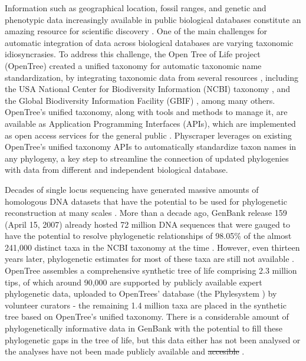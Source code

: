 \documentclass{bmcart}
\providecommand{\DIFaddtex}[1]{{\protect\color{blue}\uwave{#1}}} %
\providecommand{\DIFdeltex}[1]{{\protect\color{red}\sout{#1}}}                      %
\providecommand{\DIFaddbegin}{} %
\providecommand{\DIFaddend}{} %
\providecommand{\DIFdelbegin}{} %
\providecommand{\DIFdelend}{} %
\providecommand{\DIFadd}[1]{\texorpdfstring{\DIFaddtex{#1}}{#1}} %
\providecommand{\DIFdel}[1]{\texorpdfstring{\DIFdeltex{#1}}{}} %
\begin{document}
Information such as
geographical location, fossil ranges, and genetic and phenotypic data increasingly
available in public biological databases constitute an amazing
resource for scientific discovery \cite{baxevanis2015importance}.
One of the main challenges for automatic
integration of data across biological databases are varying taxonomic idiosyncrasies.
To address this challenge, the Open Tree of Life project (OpenTree)
created a unified taxonomy for automatic taxonomic name standardization, by integrating taxonomic
data from several resources \cite{rees2017automated}, including the USA National
Center for Biodiversity Information (NCBI) taxonomy \cite{federhen_ncbi_2012, schoch_ncbi_2020},
and the Global Biodiversity Information Facility (GBIF) \cite{gbif_secretariat_gbif_2019}, among many others.
OpenTree's unified taxonomy, along with tools and methods to manage it, are available
as Application Programming Interfaces (APIs),
which are implemented as open access services for the general public \cite{opentreeAPIs}.
Physcraper leverages on existing OpenTree's unified taxonomy APIs to automatically
standardize taxon names in any phylogeny, a key step to streamline the connection
of updated phylogenies with data from different and independent biological database.

Decades of single locus sequencing have generated
massive amounts of homologous DNA datasets that have the potential to be used for phylogenetic
reconstruction at many scales \cite{sanderson2008phylota}.
More than a decade ago, GenBank release 159 (April 15, 2007) already hosted 72
million DNA sequences that were gauged to have the potential to resolve phylogenetic
relationships of 98.05\% of the almost 241,000
distinct taxa in the NCBI taxonomy at the time \cite{sanderson2008phylota}.
However, even thirteen years later, phylogenetic estimates for most of these taxa
are still not available \cite{mctavish_how_2017}.
OpenTree assembles a comprehensive synthetic tree of life comprising
2.3 million tips, of which around
90,000 are supported by publicly available expert phylogenetic data, uploaded to OpenTrees' database (the Phylesystem
\cite{mctavish2015phylesystem}) by volunteer curators - the remaining 1.4 million taxa are placed
in the synthetic tree based on OpenTree's unified taxonomy.
There is a considerable amount of phylogenetically
informative data in GenBank with the potential to fill these phylogenetic gaps in
the tree of life, but this data either has not been analysed or the analyses
have not been made publicly available and \DIFdelbegin \DIFdel{accesible }\DIFdelend \DIFaddbegin \DIFadd{accessible }\DIFaddend \cite{mctavish_how_2017}.
\end{document}
